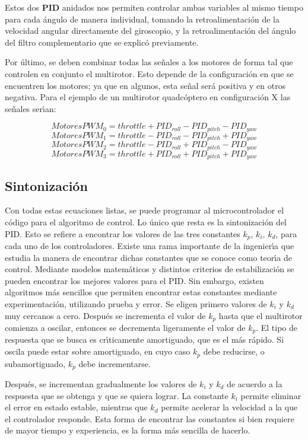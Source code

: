 \documentclass[journal]{IEEEtran}
\begin{document}
Estos dos \textbf{PID} anidados nos permiten controlar ambas variables al mismo tiempo para cada \'angulo de manera individual, tomando la retroalimentaci\'on de la velocidad angular directamente del giroscopio, y la retroalimentaci\'on del \'angulo del filtro complementario que se explic\'o previamente. 

Por \'ultimo, se deben combinar todas las se\~nales a los motores de forma tal que controlen en conjunto el multirotor. Esto depende de la configuraci\'on en que se encuentren los motores; ya que en algunos, esta se\~nal ser\'a positiva y en otros negativa. Para el ejemplo de un multirotor quadc\'optero en configuraci\'on X las se\~nales ser{\'\i}an:

\[MotoresPWM_0=throttle+PID_{roll}-PID_{pitch} -PID_{yaw}\]
\[MotoresPWM_1=throttle-PID_{roll}-PID_{pitch} +PID_{yaw}\]
\[MotoresPWM_2=throttle-PID_{roll}+PID_{pitch} -PID_{yaw}\]
\[MotoresPWM_3=throttle+PID_{roll}+PID_{pitch} +PID_{yaw}\]

\subsection{Sintonizaci\'on}

Con todas estas ecuaciones listas, se puede programar al microcontrolador el c\'odigo para el algoritmo de control. Lo \'unico que resta es la sintonizaci\'on del PID. Esto se refiere a encontrar los valores de las tres constantes $k_p$, $k_i$, $k_d$, para cada uno de los controladores. 
Existe una rama importante de la ingenier{\'\i}a que estudia la manera de encontrar dichas constantes que se conoce como teor{\'\i}a de control. Mediante modelos matem\'aticos y distintos criterios de estabilizaci\'on se pueden encontrar los mejores valores para el PID.
Sin embargo, existen algoritmos m\'as sencillos que permiten encontrar estas constantes mediante experimentaci\'on, utilizando prueba y error. Se eligen primero valores de $k_i$ y $k_d$ muy cercanos a cero. Despu\'es se incrementa el valor de $k_p$ hasta que el multirotor comienza a oscilar, entonces se decrementa ligeramente el valor de $k_p$.
El tipo de respuesta que se busca es cr{\'\i}ticamente amortiguado, que es el m\'as r\'apido. Si oscila puede estar sobre amortiguado, en cuyo caso $k_p$ debe reducirse, o subamortiguado, $k_p$ debe incrementarse.

Despu\'es, se incrementan gradualmente los valores de $k_i$ y $k_d$ de acuerdo a la respuesta que se obtenga y que se quiera lograr. La constante $k_i$ permite eliminar el error en estado estable, mientras que $k_d$ permite acelerar la velocidad a la que el controlador responde. Esta forma de encontrar las constantes si bien requiere de mayor tiempo y experiencia, es la forma m\'as sencilla de hacerlo.  
\end{document}
